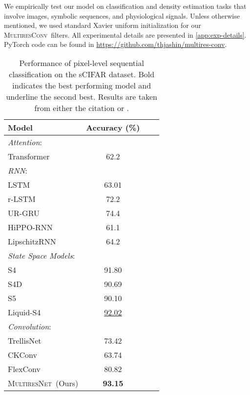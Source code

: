 \documentclass{article}
\theoremstyle{plain}
\theoremstyle{definition}
\theoremstyle{remark}
\newcommand{\ourmodel}{\textsc{MultiresNet}}
\newcommand{\ourconv}{\textsc{MultiresConv}}
\begin{document}
We empirically test our model on classification and density estimation tasks that involve images, symbolic sequences, and physiological signals. 
Unless otherwise mentioned, we used standard Xavier uniform initialization for our \ourconv\ filters. 
All experimental details are presented in \cref{app:exp-details}. 
PyTorch code can be found in \url{https://github.com/thjashin/multires-conv}.
 


\begin{table}[t]
    \centering
    \vspace{-0.08in}
    \caption{Performance of pixel-level sequential classification on the sCIFAR dataset. Bold indicates the best performing model and underline the second best. Results are taken from either the citation or \citet{hasani2022liquid}.}
    \label{tab:scifar}
        \vskip 0.1in
        \begin{small}
            \begin{tabular}{lccc}
                \toprule
                Model & Accuracy (\%) \\
                \midrule
                \emph{Attention}: & \\
                Transformer \citep{trinh2018learning} & 62.2 \\
                \midrule
                \emph{RNN}: & \\
                LSTM \citep{hochreiter1997long} & 63.01 \\
                r-LSTM \citep{trinh2018learning} & 72.2 \\
                UR-GRU \citep{gu2020improving} & 74.4 \\
                HiPPO-RNN \citep{gu2020hippo} & 61.1 \\
                LipschitzRNN \citep{erichson2021lipschitz} & 64.2 \\
                \midrule
                \emph{State Space Models}: & \\
                S4 \citep{gu2021efficiently} & 91.80 \\
                S4D \citep{guparameterization} & 90.69 \\
                S5 \citep{smith2022simplified} &  90.10 \\
                Liquid-S4 \citep{hasani2022liquid} & \underline{92.02} \\
                \midrule
                \emph{Convolution}: & \\
                TrellisNet \citep{bai2019trellis} & 73.42 \\
                CKConv \citep{romerockconv} & 63.74 \\
                FlexConv \citep{romero2022flexconv} & 80.82 \\
                \ourmodel~(Ours) & \textbf{93.15} \\
                \bottomrule
            \end{tabular}
        \end{small} 
\end{table}
\end{document}
